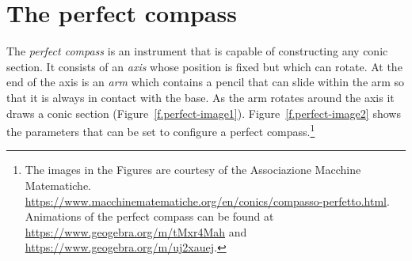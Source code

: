 \documentclass[11pt,a4paper]{report}
\begin{document}

\section{The perfect compass}\label{s.perfect}

The \emph{perfect compass} is an instrument that is capable of constructing any conic section. It consists of an \emph{axis} whose position is fixed but which can rotate. At the end of the axis is an \emph{arm} which contains a pencil that can slide within the arm so that it is always in contact with the base. As the arm rotates around the axis it draws a conic section (Figure~\ref{f.perfect-image1}). Figure~\ref{f.perfect-image2} shows the parameters that can be set to configure a perfect compass.\footnote{The images in the Figures are courtesy of the Associazione Macchine Matematiche. \\\hspace*{1.5em} \url{https://www.macchinematematiche.org/en/conics/compasso-perfetto.html}.\\\hspace*{1.5em} Animations of the perfect compass can be found at \url{https://www.geogebra.org/m/tMxr4Mah} and\\\hspace*{1.5em} \url{https://www.geogebra.org/m/uj2xauej}.}
\end{document}
